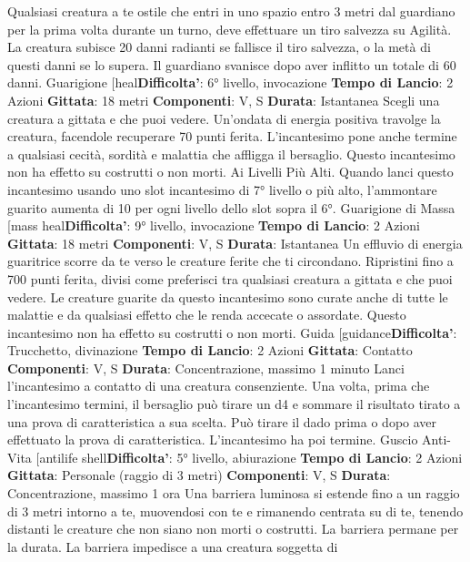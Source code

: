 \begin{multicols}{2}
Qualsiasi creatura a te ostile che entri in uno spazio
entro 3 metri dal guardiano per la prima volta durante
un turno, deve effettuare un tiro salvezza su Agilità.
La creatura subisce 20 danni radianti se fallisce il tiro
salvezza, o la metà di questi danni se lo supera. Il
guardiano svanisce dopo aver inflitto un totale di 60
danni.
Guarigione
[heal\textbf{Difficolta'}:
6° livello, invocazione
\textbf{Tempo di Lancio}: 2 Azioni
\textbf{Gittata}: 18 metri
\textbf{Componenti}: V, S
\textbf{Durata}: Istantanea
Scegli una creatura a gittata e che puoi vedere.
Un’ondata di energia positiva travolge la creatura,
facendole recuperare 70 punti ferita. L’incantesimo
pone anche termine a qualsiasi cecità, sordità e
malattia che affligga il bersaglio. Questo incantesimo
non ha effetto su costrutti o non morti.
Ai Livelli Più Alti. Quando lanci questo incantesimo
usando uno slot incantesimo di 7° livello o più alto,
l’ammontare guarito aumenta di 10 per ogni livello dello
slot sopra il 6°.
Guarigione di Massa
[mass heal\textbf{Difficolta'}:
9° livello, invocazione
\textbf{Tempo di Lancio}: 2 Azioni
\textbf{Gittata}: 18 metri
\textbf{Componenti}: V, S
\textbf{Durata}: Istantanea
Un effluvio di energia guaritrice scorre da te verso le
creature ferite che ti circondano. Ripristini fino a 700
punti ferita, divisi come preferisci tra qualsiasi creatura
a gittata e che puoi vedere. Le creature guarite da
questo incantesimo sono curate anche di tutte le
malattie e da qualsiasi effetto che le renda accecate o
assordate. Questo incantesimo non ha effetto su
costrutti o non morti.
Guida
[guidance\textbf{Difficolta'}:
Trucchetto, divinazione
\textbf{Tempo di Lancio}: 2 Azioni
\textbf{Gittata}: Contatto
\textbf{Componenti}: V, S
\textbf{Durata}: Concentrazione, massimo 1 minuto
Lanci l’incantesimo a contatto di una creatura
consenziente. Una volta, prima che l’incantesimo
termini, il bersaglio può tirare un d4 e sommare il
risultato tirato a una prova di caratteristica a sua scelta.
Può tirare il dado prima o dopo aver effettuato la prova
di caratteristica. L’incantesimo ha poi termine.
Guscio Anti-Vita
[antilife shell\textbf{Difficolta'}:
5° livello, abiurazione
\textbf{Tempo di Lancio}: 2 Azioni
\textbf{Gittata}: Personale (raggio di 3 metri)
\textbf{Componenti}: V, S
\textbf{Durata}: Concentrazione, massimo 1 ora
Una barriera luminosa si estende fino a un raggio di 3
metri intorno a te, muovendosi con te e rimanendo
centrata su di te, tenendo distanti le creature che non
siano non morti o costrutti. La barriera permane per la
durata.
La barriera impedisce a una creatura soggetta di

\end{multicols}
